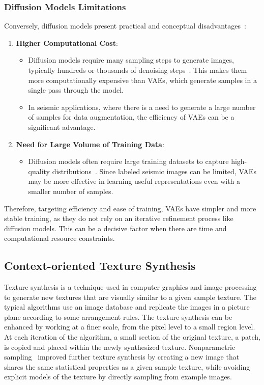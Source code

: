 \documentclass{ieeeaccess}
\begin{document}
\subsubsection{Diffusion Models Limitations}
Conversely, diffusion models present practical and conceptual disadvantages~\cite{Zhou2024}:
\begin{enumerate}
    \item \textbf{Higher Computational Cost}:
    \begin{itemize}
        \item Diffusion models require many sampling steps to generate images, typically hundreds or thousands of denoising steps~\cite{Zhou2024}. This makes them more computationally expensive than VAEs, which generate samples in a single pass through the model.
        \item In seismic applications, where there is a need to generate a large number of samples for data augmentation, the efficiency of VAEs can be a significant advantage. 
    \end{itemize}
    \item \textbf{Need for Large Volume of Training Data}:
    \begin{itemize}
        \item Diffusion models often require large training datasets to capture high-quality distributions~\cite{Zhou2024}. Since labeled seismic images can be limited, VAEs may be more effective in learning useful representations even with a smaller number of samples.
    \end{itemize}
\end{enumerate}

Therefore, targeting efficiency and ease of training, VAEs have simpler and more stable training, as they do not rely on an iterative refinement process like diffusion models. This can be a decisive factor when there are time and computational resource constraints.

\subsection{Context-oriented Texture Synthesis}

Texture synthesis is a technique used in computer graphics and image processing to generate new textures that are visually similar to a given sample texture. The typical algorithms use an image database and replicate the images in a picture plane according to some arrangement rules. The texture synthesis can be enhanced by working at a finer scale, from the pixel level to a small region level. At each iteration of the algorithm, a small section of the original texture, a patch, is copied and placed within the newly synthesized texture. Nonparametric sampling~\cite{Efros1999} improved further texture synthesis by creating a new image that shares the same statistical properties as a given sample texture, while avoiding explicit models of the texture by directly sampling from example images.
\end{document}
